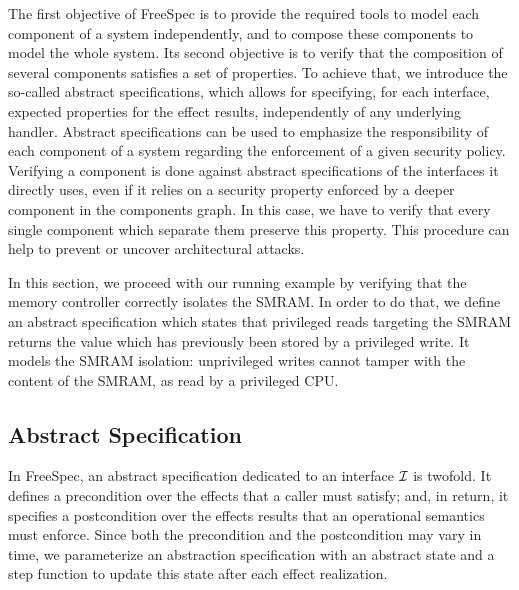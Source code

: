 The first objective of FreeSpec is to provide the required tools to model each
component of a system independently, and to compose these components to model
the whole system.
%
Its second objective is to verify that the composition of several components
satisfies a set of properties.
%
To achieve that, we introduce the so-called abstract specifications, which
allows for specifying, for each interface, expected properties for the effect
results, independently of any underlying handler.
%
Abstract specifications can be used to emphasize the responsibility of each
component of a system regarding the enforcement of a given security policy.
%
Verifying a component is done against abstract specifications of the interfaces
it directly uses, even if it relies on a security property enforced by a deeper
component in the components graph.
%
In this case, we have to verify that every single component which separate them
preserve this property.
%
This procedure can help to prevent or uncover architectural attacks.

In this section, we proceed with our running example by verifying that the
memory controller correctly isolates the SMRAM.
%
In order to do that, we define an abstract specification which states that
privileged reads targeting the SMRAM returns the value which has previously been
stored by a privileged write. It models the SMRAM isolation: unprivileged writes
cannot tamper with the content of the SMRAM, as read by a privileged CPU.

\subsection{Abstract Specification}

In FreeSpec, an abstract specification dedicated to an interface $\mathcal{I}$ is
twofold.
%
It defines a precondition over the effects that a caller must satisfy; and, in
return, it specifies a postcondition over the effects results that an
operational semantics must enforce.
%
Since both the precondition and the postcondition may vary in time, we
parameterize an abstraction specification with an abstract state and a step
function to update this state after each effect realization.


